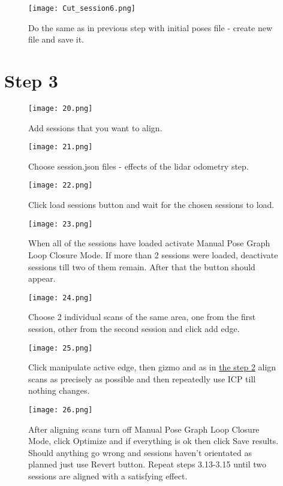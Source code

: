 \begin{figure}[H]
	\centering
	\texttt{[image: Cut\_session6.png]}
	\caption{Do the same as in previous step with initial poses file - create new file and save it.}
	\label{fig:25}
\end{figure}

\section{Step 3}
\begin{figure}[H]
	\centering
	\texttt{[image: 20.png]}
	\caption{Add sessions that you want to align.}
	\label{fig:26}
\end{figure}

\begin{figure}[H]
	\centering
	\texttt{[image: 21.png]}
	\caption{Choose session.json files - effects of the lidar odometry step.}
	\label{fig:27}
\end{figure}

\begin{figure}[H]
	\centering
	\texttt{[image: 22.png]}
	\caption{Click load sessions button and wait for the chosen sessions to load.}
	\label{fig:28}
\end{figure}

\begin{figure}[H]
	\centering
	\texttt{[image: 23.png]}
	\caption{When all of the sessions have loaded activate Manual Pose Graph Loop Closure Mode. If more than 2 sessions were loaded, deactivate sessions till two of them remain. After that the button should appear.}
	\label{fig:29}
\end{figure}

\begin{figure}[H]
	\centering
	\texttt{[image: 24.png]}
	\caption{Choose 2 individual scans of the same area, one from the first session, other from the second session and click add edge.}
	\label{fig:30}
\end{figure}

\begin{figure}[H]
	\centering
	\texttt{[image: 25.png]}
	\caption{Click manipulate active edge, then gizmo and as in \hyperref[fig:15]{the step 2} align scans as precisely as possible and then repeatedly use ICP till nothing changes.}
	\label{fig:31}
\end{figure}

\begin{figure}[H]
	\centering
	\texttt{[image: 26.png]}
	\caption{After aligning scans turn off Manual Pose Graph Loop Closure Mode, click Optimize and if everything is ok then click Save results. Should anything go wrong and sessions haven't orientated as planned just use Revert button. Repeat steps 3.13-3.15 until two sessions are aligned with a satisfying effect.}
	\label{fig:32}
\end{figure}


